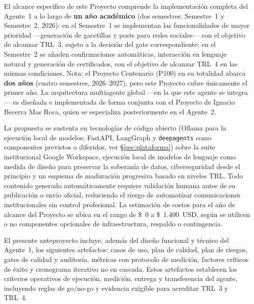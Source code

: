 \documentclass[a4paper, 12pt]{article}
\begin{document}
El alcance espec\'ifico de este Proyecto comprende la implementaci\'on completa del Agente~1 a lo largo de \textbf{un a\~no acad\'emico} (dos semestres: Semestre~1 y Semestre~2, 2026): en el Semestre~1 se implementan las funcionalidades de mayor prioridad ---generaci\'on de gacetillas y posts para redes sociales--- con el objetivo de alcanzar \ac{TRL}~3, sujeto a la decisi\'on del gate correspondiente; en el Semestre~2 se a\~naden confirmaciones autom\'aticas, interacci\'on en lenguaje natural y generaci\'on de certificados, con el objetivo de alcanzar \ac{TRL}~4 en las mismas condiciones. Nota: el Proyecto Centenario (\ac{P100}) en su totalidad abarca \textbf{dos a\~nos} (cuatro semestres, 2026--2027), pero este Proyecto cubre \'unicamente el primer a\~no. La arquitectura multiagente global ---en la que este agente se integra--- es dise\~nada e implementada de forma conjunta con el Proyecto de Ignacio Becerra Mas Roca, quien se especializa posteriormente en el Agente~2.

La propuesta se sustenta en tecnolog\'ias de c\'odigo abierto (Ollama para la ejecuci\'on local de modelos; FastAPI, LangGraph y \texttt{deepagents} como componentes previstos o diferidos, ver \S\ref{sec:plataforma}) sobre la suite institucional Google Workspace, ejecuci\'on local de modelos de lenguaje como medida de dise\~no para preservar la soberan\'ia de datos, ciberseguridad desde el principio y un esquema de maduraci\'on progresiva basado en niveles \ac{TRL}. Todo contenido generado autom\'aticamente requiere validaci\'on humana antes de su publicaci\'on o env\'io oficial, reduciendo el riesgo de automatizar comunicaciones institucionales sin control profesional. La estimaci\'on de costos para el a\~no de alcance del Proyecto se ubica en el rango de \$~0 a \$~1.400~USD, seg\'un se utilicen o no componentes opcionales de infraestructura, respaldo o contingencia.

El presente anteproyecto incluye, adem\'as del dise\~no funcional y t\'ecnico del Agente~1, los siguientes artefactos: casos de uso, plan de calidad, plan de riesgos, gates de calidad y auditor\'ia, m\'etricas con protocolo de medici\'on, factores cr\'iticos de \'exito y cronograma iterativo no en cascada. Estos artefactos establecen los criterios operativos de ejecuci\'on, medici\'on, entrega y transferencia del agente, incluyendo reglas de go/no-go y evidencia exigible para acreditar \ac{TRL}~3 y \ac{TRL}~4.

\end{document}
